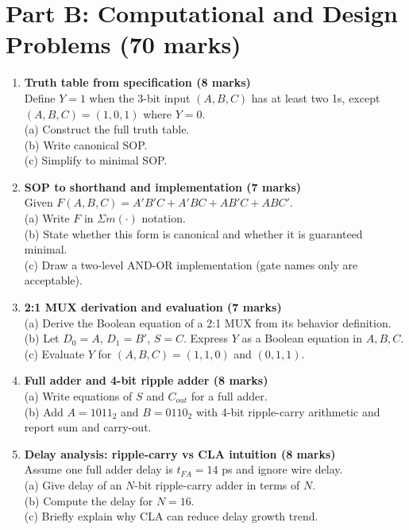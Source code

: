 \documentclass[11pt]{article}
\begin{document}
\section*{Part B: Computational and Design Problems (70 marks)}
\begin{enumerate}[label=\textbf{B\arabic*.}]
  \item \textbf{Truth table from specification (8 marks)}\\
  Define $Y=1$ when the 3-bit input $(A,B,C)$ has at least two 1s, except $(A,B,C)=(1,0,1)$ where $Y=0$.\\
  (a) Construct the full truth table.\\
  (b) Write canonical SOP.\\
  (c) Simplify to minimal SOP.

  \item \textbf{SOP to shorthand and implementation (7 marks)}\\
  Given $F(A,B,C)=A'B'C + A'BC + AB'C + ABC'$.\\
  (a) Write $F$ in $\Sigma m(\cdot)$ notation.\\
  (b) State whether this form is canonical and whether it is guaranteed minimal.\\
  (c) Draw a two-level AND-OR implementation (gate names only are acceptable).

  \item \textbf{2:1 MUX derivation and evaluation (7 marks)}\\
  (a) Derive the Boolean equation of a 2:1 MUX from its behavior definition.\\
  (b) Let $D_0=A$, $D_1=B'$, $S=C$. Express $Y$ as a Boolean equation in $A,B,C$.\\
  (c) Evaluate $Y$ for $(A,B,C)=(1,1,0)$ and $(0,1,1)$.

  \item \textbf{Full adder and 4-bit ripple adder (8 marks)}\\
  (a) Write equations of $S$ and $C_{out}$ for a full adder.\\
  (b) Add $A=1011_2$ and $B=0110_2$ with 4-bit ripple-carry arithmetic and report sum and carry-out.

  \item \textbf{Delay analysis: ripple-carry vs CLA intuition (8 marks)}\\
  Assume one full adder delay is $t_{FA}=14$ ps and ignore wire delay.\\
  (a) Give delay of an $N$-bit ripple-carry adder in terms of $N$.\\
  (b) Compute the delay for $N=16$.\\
  (c) Briefly explain why CLA can reduce delay growth trend.


\end{enumerate}
\end{document}
